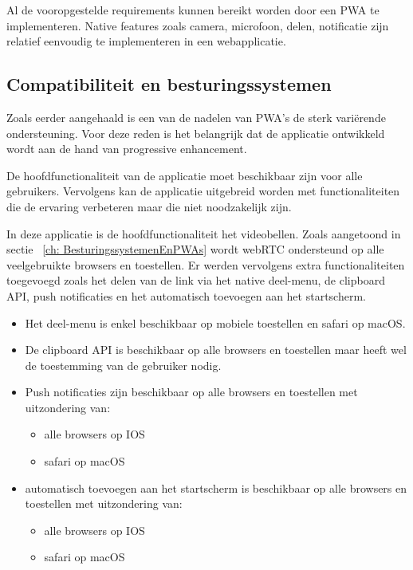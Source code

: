 	
	Al de vooropgestelde requirements kunnen bereikt worden door een PWA te implementeren. 
	Native features zoals camera, microfoon, delen, notificatie zijn relatief eenvoudig te implementeren in een webapplicatie.
	
	\subsection{Compatibiliteit en besturingssystemen}
		Zoals eerder aangehaald is een van de nadelen van PWA's de sterk variërende ondersteuning. Voor deze reden is het belangrijk dat de applicatie ontwikkeld wordt aan de hand van progressive enhancement. 
		
		De hoofdfunctionaliteit van de applicatie moet beschikbaar zijn voor alle gebruikers. Vervolgens kan de applicatie uitgebreid worden met functionaliteiten die de ervaring verbeteren maar die niet noodzakelijk zijn.
		
		In deze applicatie is de hoofdfunctionaliteit het videobellen. Zoals aangetoond in sectie ~\ref{ch: BesturingssystemenEnPWAs} wordt webRTC ondersteund op alle veelgebruikte browsers en toestellen.  Er werden vervolgens extra functionaliteiten toegevoegd zoals het delen van de link via het native deel-menu, de clipboard API, push notificaties en het automatisch toevoegen aan het startscherm.
		\begin{itemize}
	  		\item Het deel-menu is enkel beschikbaar op mobiele toestellen en safari op macOS.
	  		\item De clipboard API is beschikbaar op alle browsers en toestellen maar heeft wel de toestemming van de gebruiker nodig.
	  		\item Push notificaties zijn beschikbaar op alle browsers en toestellen met uitzondering van:
	  				\begin{itemize}
	  			  		\item alle browsers op IOS
	  			  		\item safari op macOS
	  		 		\end{itemize}	
  			\item automatisch toevoegen aan het startscherm is beschikbaar op alle browsers en toestellen met uitzondering van:
	  				\begin{itemize}
	  			  		\item alle browsers op IOS
	  			  		\item safari op macOS
	  		 		\end{itemize}	
 		\end{itemize}
 		
